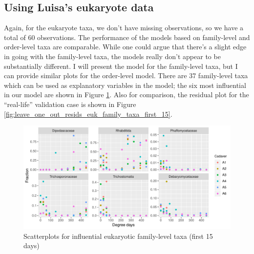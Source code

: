 \documentclass{article}
\begin{document}
\subsection{Using Luisa's eukaryote data}

Again, for the eukaryote taxa, we don't have missing observations, so
we have a total of 60 observations.  The performance of the models
based on family-level and order-level taxa are comparable.  While one
could argue that there's a slight edge in going with the family-level
taxa, the models really don't appear to be substantially different.  I
will present the model for the family-level taxa, but I can provide
similar plots for the order-level model.  There are 37 family-level
taxa which can be used as explanatory variables in the model; the six
most influential in our model are shown in Figure
\ref{fig:infl_euk_family_scatter_first_15}.  Also for comparison, the
residual plot for the ``real-life'' validation case is shown in Figure
\ref{fig:leave_one_out_resids_euk_family_taxa_first_15}.
\begin{figure}
  \centering
  \includegraphics[width=6.5in]{../eukaryote_data/only_families/first_two_weeks/hit_1perc_twice/infl_euk_family_first_two_weeks_scatter}
  \caption{Scatterplots for influential eukaryotic family-level taxa (first 15 days)}
  \label{fig:infl_euk_family_scatter_first_15}
\end{figure}
\end{document}
